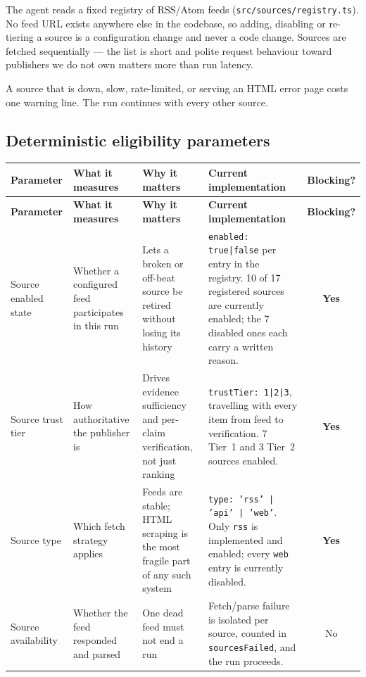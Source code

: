 \documentclass[11pt,a4paper]{article}
\newcommand{\file}[1]{\textcolor{aitkGray}{\texttt{\footnotesize\hyphenpenalty=0\exhyphenpenalty=0\relax #1}}}
\newcommand{\brk}{\hyphenpenalty=0\exhyphenpenalty=0\relax}
\newcommand{\code}[1]{\texttt{\small\brk #1}}
\newcommand{\Yes}{\textcolor{aitkStop}{\textbf{Yes}}}
\newcommand{\No}{\textcolor{aitkGray}{No}}
\begin{document}
The agent reads a fixed registry of RSS/Atom feeds (\file{src/sources/registry.ts}).
No feed URL exists anywhere else in the codebase, so adding, disabling or
re-tiering a source is a configuration change and never a code change. Sources
are fetched sequentially --- the list is short and polite request behaviour toward
publishers we do not own matters more than run latency.

A source that is down, slow, rate-limited, or serving an HTML error page costs
one warning line. The run continues with every other source.

\subsection{Deterministic eligibility parameters}

\begin{center}
\footnotesize
\begin{longtable}{@{}>{\RaggedRight}p{2.6cm}>{\RaggedRight}p{2.9cm}>{\RaggedRight}p{3.0cm}>{\RaggedRight}p{4.4cm}c@{}}
\toprule
\textbf{Parameter} & \textbf{What it measures} & \textbf{Why it matters} &
\textbf{Current implementation} & \textbf{Blocking?} \\
\midrule
\endfirsthead
\toprule
\textbf{Parameter} & \textbf{What it measures} & \textbf{Why it matters} &
\textbf{Current implementation} & \textbf{Blocking?} \\
\midrule
\endhead

Source enabled state &
Whether a configured feed participates in this run &
Lets a broken or off-beat source be retired without losing its history &
\code{enabled: true|false} per entry in the registry. 10 of 17 registered sources
are currently enabled; the 7 disabled ones each carry a written reason. &
\Yes \\

Source trust tier &
How authoritative the publisher is &
Drives evidence sufficiency and per-claim verification, not just ranking &
\code{trustTier: 1|2|3}, travelling with every item from feed to verification.
7 Tier~1 and 3 Tier~2 sources enabled. &
\Yes \\

Source type &
Which fetch strategy applies &
Feeds are stable; HTML scraping is the most fragile part of any such system &
\code{type: 'rss' | 'api' | 'web'}. Only \code{rss} is implemented and enabled;
every \code{web} entry is currently disabled. &
\Yes \\

Source availability &
Whether the feed responded and parsed &
One dead feed must not end a run &
Fetch/parse failure is isolated per source, counted in \code{sourcesFailed},
and the run proceeds. &
\No \\


\end{longtable}
\end{center}
\end{document}
